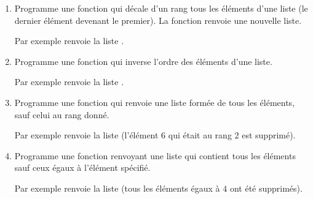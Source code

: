 \documentclass[11pt,class=report,crop=false]{standalone}
\begin{document}

\begin{activite}


\begin{enumerate}
  \item Programme une fonction  qui décale d'un rang tous les éléments d'une liste (le dernier élément devenant le premier). La fonction renvoie une nouvelle liste.
  
  Par exemple  renvoie la liste \ci{[4,1,2,3]}.
  
  \item Programme une fonction  qui inverse l'ordre des éléments d'une liste. 
  
  Par exemple  renvoie la liste \ci{[4,3,2,1]}.
  
  \item Programme une fonction  qui renvoie une liste formée de tous les éléments, sauf celui au rang donné. 
  
  Par exemple  renvoie la liste \ci{[8,7,5,4]} (l'élément $6$ qui était au rang $2$ est supprimé).
  
    \item Programme une fonction  renvoyant une liste qui contient tous les éléments sauf ceux égaux à l'élément spécifié. 
    
 Par exemple  renvoie la liste \ci{[8,7,6,5]} (tous les éléments égaux à $4$ ont été supprimés).
    
\end{enumerate}

\end{activite}
\end{document}
